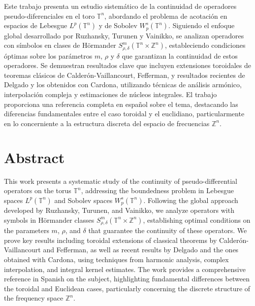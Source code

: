 
	Este trabajo presenta un estudio sistemático de la continuidad de operadores pseudo-diferenciales en el toro $\mathbb{T}^n$, abordando el problema de acotación en espacios de Lebesgue $L^p(\mathbb{T}^n)$ y de Sobolev $W^s_p(\mathbb{T}^n)$. Siguiendo el enfoque global desarrollado por Ruzhansky, Turunen y Vainikko, se analizan operadores con símbolos en clases de Hörmander $S^m_{\rho,\delta}(\mathbb{T}^n \times \mathbb{Z}^n)$, estableciendo condiciones óptimas sobre los parámetros $m$, $\rho$ y $\delta$ que garantizan la continuidad de estos operadores. Se demuestran resultados clave que incluyen extensiones toroidales de teoremas clásicos de Calderón-Vaillancourt, Fefferman, y resultados recientes de Delgado y los obtenidos con Cardona, utilizando técnicas de análisis armónico, interpolación compleja y estimaciones de núcleos integrales. El trabajo proporciona una referencia completa en español sobre el tema, destacando las diferencias fundamentales entre el caso toroidal y el euclidiano, particularmente en lo concerniente a la estructura discreta del espacio de frecuencias $\mathbb{Z}^n$.
	
	\chapter*{Abstract}
		This work presents a systematic study of the continuity of pseudo-differential operators on the torus $\mathbb{T}^n$, addressing the boundedness problem in Lebesgue spaces $L^p(\mathbb{T}^n)$ and Sobolev spaces $W^s_p(\mathbb{T}^n)$. Following the global approach developed by Ruzhansky, Turunen, and Vainikko, we analyze operators with symbols in Hörmander classes $S^m_{\rho,\delta}(\mathbb{T}^n \times \mathbb{Z}^n)$, establishing optimal conditions on the parameters $m$, $\rho$, and $\delta$ that guarantee the continuity of these operators. We prove key results including toroidal extensions of classical theorems by Calderón-Vaillancourt and Fefferman, as well as recent results by Delgado and the ones obtained with Cardona, using techniques from harmonic analysis, complex interpolation, and integral kernel estimates. The work provides a comprehensive reference in Spanish on the subject, highlighting fundamental differences between the toroidal and Euclidean cases, particularly concerning the discrete structure of the frequency space $\mathbb{Z}^n$.
